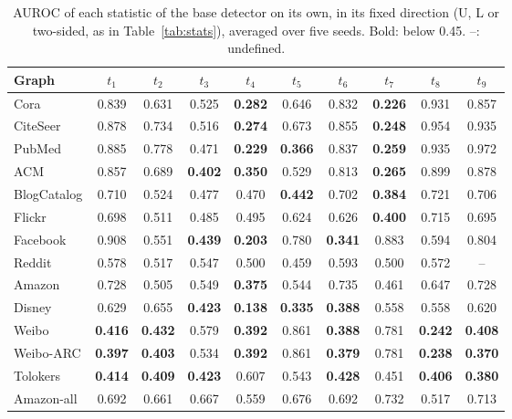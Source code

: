 \documentclass[pdflatex,sn-mathphys-ay]{sn-jnl}
\theoremstyle{plain}
\theoremstyle{remark}
\begin{document}
\begin{appendices}
\begin{table}[h]
\caption{AUROC of each statistic of the base detector on its own, in its fixed direction (U, L or two-sided, as in Table~\ref{tab:stats}), averaged over five seeds. Bold: below 0.45. --: undefined.}
\label{tab:diag}
\scriptsize
\setlength{\tabcolsep}{3pt}
\begin{tabular*}{\textwidth}{@{\extracolsep{\fill}}lccccccccc@{}}
\toprule
Graph & $t_1$ & $t_2$ & $t_3$ & $t_4$ & $t_5$ & $t_6$ & $t_7$ & $t_8$ & $t_9$ \\
\midrule
Cora & 0.839 & 0.631 & 0.525 & \textbf{0.282} & 0.646 & 0.832 & \textbf{0.226} & 0.931 & 0.857 \\
CiteSeer & 0.878 & 0.734 & 0.516 & \textbf{0.274} & 0.673 & 0.855 & \textbf{0.248} & 0.954 & 0.935 \\
PubMed & 0.885 & 0.778 & 0.471 & \textbf{0.229} & \textbf{0.366} & 0.837 & \textbf{0.259} & 0.935 & 0.972 \\
ACM & 0.857 & 0.689 & \textbf{0.402} & \textbf{0.350} & 0.529 & 0.813 & \textbf{0.265} & 0.899 & 0.878 \\
BlogCatalog & 0.710 & 0.524 & 0.477 & 0.470 & \textbf{0.442} & 0.702 & \textbf{0.384} & 0.721 & 0.706 \\
Flickr & 0.698 & 0.511 & 0.485 & 0.495 & 0.624 & 0.626 & \textbf{0.400} & 0.715 & 0.695 \\
Facebook & 0.908 & 0.551 & \textbf{0.439} & \textbf{0.203} & 0.780 & \textbf{0.341} & 0.883 & 0.594 & 0.804 \\
\midrule
Reddit & 0.578 & 0.517 & 0.547 & 0.500 & 0.459 & 0.593 & 0.500 & 0.572 & -- \\
Amazon & 0.728 & 0.505 & 0.549 & \textbf{0.375} & 0.544 & 0.735 & 0.461 & 0.647 & 0.728 \\
Disney & 0.629 & 0.655 & \textbf{0.423} & \textbf{0.138} & \textbf{0.335} & \textbf{0.388} & 0.558 & 0.558 & 0.620 \\
Weibo & \textbf{0.416} & \textbf{0.432} & 0.579 & \textbf{0.392} & 0.861 & \textbf{0.388} & 0.781 & \textbf{0.242} & \textbf{0.408} \\
Weibo-ARC & \textbf{0.397} & \textbf{0.403} & 0.534 & \textbf{0.392} & 0.861 & \textbf{0.379} & 0.781 & \textbf{0.238} & \textbf{0.370} \\
Tolokers & \textbf{0.414} & \textbf{0.409} & \textbf{0.423} & 0.607 & 0.543 & \textbf{0.428} & 0.451 & \textbf{0.406} & \textbf{0.380} \\
Amazon-all & 0.692 & 0.661 & 0.667 & 0.559 & 0.676 & 0.692 & 0.732 & 0.517 & 0.713 \\

\end{tabular*}
\end{table}
\end{appendices}
\end{document}
